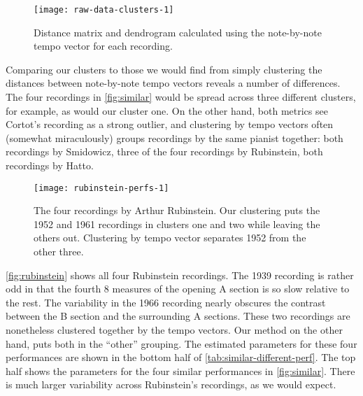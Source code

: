 \documentclass[12pt]{article}
\begin{document}
\begin{figure}[t]
  \centering
  \texttt{[image: raw-data-clusters-1]}
  \caption{Distance matrix and dendrogram calculated using the
    note-by-note tempo vector for each recording.}
  \label{fig:raw-data-clusters}
\end{figure}
Comparing our clusters to those we would find from simply clustering
the distances between note-by-note tempo vectors reveals a number of
differences. The four recordings in \autoref{fig:similar} would be
spread across three different clusters, for example, as would our
cluster one. On the other hand, both metrics see Cortot's recording as a
strong outlier, and clustering by tempo vectors often (somewhat
miraculously) groups recordings by the same pianist together: both
recordings by Smidowicz, three of the four recordings by Rubinstein,
both recordings by Hatto.
\begin{figure}[t]
  \centering
  \texttt{[image: rubinstein-perfs-1]}
  \caption{The four recordings by Arthur Rubinstein. Our clustering
    puts the 1952 and 1961 recordings in clusters one and two while
    leaving the others out. Clustering by tempo vector separates 1952
    from the other three.}
  \label{fig:rubinstein}
\end{figure}
\autoref{fig:rubinstein} shows all four Rubinstein recordings. The
1939 recording is rather odd in that the fourth 8 measures of the opening
A section is so slow relative to the rest. The variability in the 1966
recording nearly obscures the contrast between the B section and the
surrounding A sections. These two recordings are nonetheless clustered
together by the tempo vectors. Our method on the other hand, puts both
in the ``other'' grouping. The estimated parameters for these four
performances are shown in the bottom half of
\autoref{tab:similar-different-perf}. The top half shows the
parameters for the four similar performances in
\autoref{fig:similar}. There is much larger variability across
Rubinstein's recordings, as we would expect.
\end{document}
